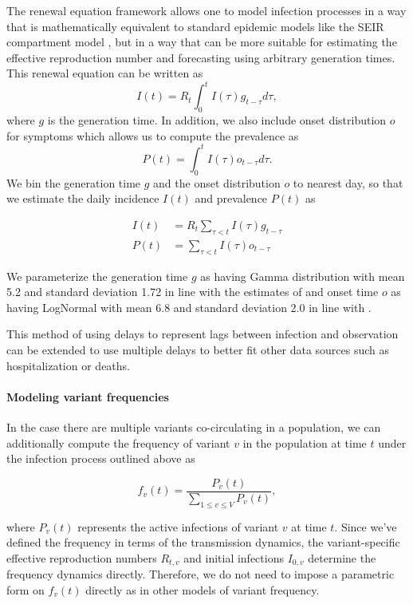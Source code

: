 \documentclass[11pt,oneside,letterpaper]{article}
\begin{document}
The renewal equation framework allows one to model infection processes in a way that is mathematically equivalent to standard epidemic models like the SEIR compartment model \cite{Champredon2018}, but in a way that can be more suitable for estimating the effective reproduction number and forecasting using arbitrary generation times. This renewal equation can be written as
\begin{equation}
  I(t) = R_{t} \int_{0}^{t} I(\tau)g_{t-\tau} d\tau,
\end{equation}
where $g$ is the generation time.
In addition, we also include onset distribution $o$ for symptoms which allows us to compute the prevalence as
\begin{equation}
  P(t) = \int_{0}^{t} I(\tau) o_{t-\tau} d \tau.
\end{equation}
We bin the generation time $g$ and the onset distribution $o$ to nearest day, so that we estimate the daily incidence $I(t)$ and prevalence $P(t)$ as

\begin{align}
  I(t) &= R_{t} \sum_{\tau < t} I(\tau) g_{t-\tau}\\
  P(t) &= \sum_{\tau < t} I(\tau) o_{t-\tau}
\end{align}

We parameterize the generation time $g$ as having Gamma distribution with mean 5.2 and standard deviation 1.72 in line with the estimates of \cite{Ganyani2020} and onset time $o$ as having LogNormal with mean 6.8 and standard deviation 2.0 in line with \cite{Cheng2021}.

This method of using delays to represent lags between infection and observation can be extended to use multiple delays to better fit other data sources such as hospitalization or deaths.

\paragraph{Modeling variant frequencies}%

In the case there are multiple variants co-circulating in a population, we can additionally compute the frequency of variant $v$ in the population at time $t$ under the infection process outlined above as

\begin{equation}
  f_{v}(t) = \frac{P_{v}(t)}{ \sum_{1\leq v \leq V} P_{v}(t)},
\end{equation}

where $P_{v}(t)$ represents the active infections of variant $v$ at time $t$.
Since we've defined the frequency in terms of the transmission dynamics, the variant-specific effective reproduction numbers $R_{t,v}$ and initial infections $I_{0, v}$ determine the frequency dynamics directly.
Therefore, we do not need to impose a parametric form on $f_{v}(t)$ directly as in other models of variant frequency.
\end{document}
